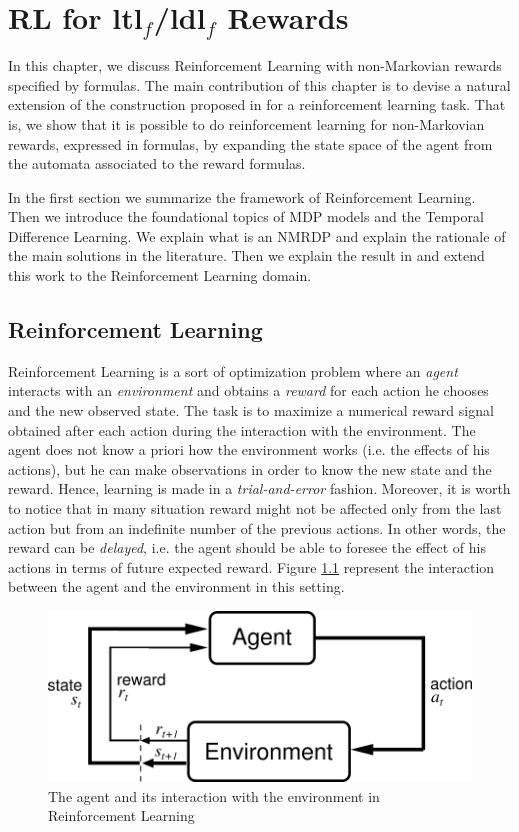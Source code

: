 \chapter{RL for {\sc ltl}$_f$/{\sc ldl}$_f$ Rewards}
\label{ch:rl}

In this chapter, we discuss Reinforcement Learning with non-Markovian rewards specified by \LLf formulas. The main contribution of this chapter is to devise a natural extension of the construction proposed in \citep{AAAI1817342} for a reinforcement learning task. That is, we show that it is possible to do reinforcement learning for non-Markovian rewards, expressed in \LLf formulas, by expanding the state space of the agent from the automata associated to the \LLf reward formulas.

In the first section we summarize the framework of Reinforcement Learning. Then we introduce the foundational topics of MDP models and the Temporal Difference Learning. We explain what is an NMRDP and explain the rationale of the main solutions in the literature. Then we explain the result in \citep{AAAI1817342} and extend this work to the Reinforcement Learning domain.
\section{Reinforcement Learning}
\label{RL}
Reinforcement Learning \citep{Sutton:1998:IRL:551283} is a sort of optimization problem where an \emph{agent} interacts with an \emph{environment} and obtains a \emph{reward} for each action he chooses and the new observed state. The task is to maximize a numerical reward signal obtained after each action during the interaction with the environment. The agent does not know a priori how the environment works (i.e. the effects of his actions), but he can make observations in order to know the new state and the reward. Hence, learning is made in a \emph{trial-and-error} fashion. Moreover, it is worth to notice that in many situation reward might not be affected only from the last action but from an indefinite number of the previous actions. In other words, the reward can be \emph{delayed}, i.e. the agent should be able to foresee the effect of his actions in terms of future expected reward. Figure \ref{fig:agent-environment} represent the interaction between the agent and the environment in this setting.
\begin{figure}[!h]
	\centering
	\includegraphics[width=.8\linewidth]{images/agent-environment}
	\caption{The agent and its interaction with the environment in Reinforcement Learning}\label{fig:agent-environment}
\end{figure}

